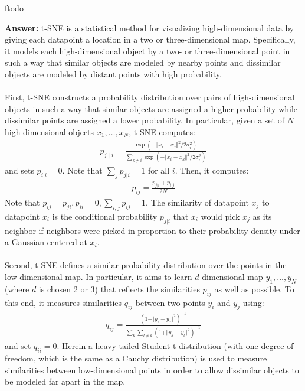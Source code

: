 ƒtodo\documentclass{article}
\newenvironment{QandA}{\begin{enumerate}[label=\arabic*.]}{\end{enumerate}}
\newenvironment{answer}{\par\normalfont \textbf{Answer:}}{}
\begin{document}
\begin{QandA}
    \begin{answer}
        t-SNE is a statistical method for visualizing high-dimensional data by giving each datapoint a location in a two or three-dimensional map. Specifically, it models each high-dimensional object by a two- or three-dimensional point in such a way that similar objects are modeled by nearby points and dissimilar objects are modeled by distant points with high probability. \\\\
        First, t-SNE constructs a probability distribution over pairs of high-dimensional objects in such a way that similar objects are assigned a higher probability while dissimilar points are assigned a lower probability. In particular, given a set of $N$ high-dimensional objects $x_1, \ldots, x_N$, t-SNE computes:
        \begin{align*}
            p_{j \mid i} = \frac{\exp(- \Vert x_i - x_j\Vert^2/2\sigma_i^2)}{\sum_{k \neq i} \exp(- \Vert x_i - x_k\Vert^2/2\sigma_i^2)}
        \end{align*}
        and sets $p_{i \vert i} = 0$. Note that $\sum_j p_{j \vert i} = 1$ for all $i$. Then, it computes:
        \begin{align*}
            p_{ij} = \frac{p_{j \vert i} + p_{i \vert j}}{2N}
        \end{align*}
    Note that $p_{ij} = p_{ji}, p_{ii} = 0, \sum_{i,j} p_{ij} = 1$. The similarity of datapoint $x_j$ to datapoint $x_i$ is the conditional probability $p_{j \vert i}$ that $x_i$ would pick $x_j$ as its neighbor if neighbors were picked in proportion to their probability density under a Gaussian centered at $x_i$. \\\\
    Second, t-SNE defines a similar probability distribution over the points in the low-dimensional map. In particular, it aims to learn $d$-dimensional map $y_1, \ldots, y_N$ (where $d$ is chosen 2 or 3) that reflects the similarities $p_{ij}$ as well as possible. To this end, it measures similarities $q_{ij}$ between two points $y_i$ and $y_j$ using:
    \begin{align*}
        q_{ij} = \frac{(1 + \Vert y_i - y_j \Vert^2)^{-1}}{\sum_k \sum_{l \neq k} (1 + \Vert y_k - y_l \Vert^2)^{-1}}
    \end{align*}
    and set $q_{ii} = 0$. Herein a heavy-tailed Student t-distribution (with one-degree of freedom, which is the same as a Cauchy distribution) is used to measure similarities between low-dimensional points in order to allow dissimilar objects to be modeled far apart in the map. \\\\

\end{answer}
\end{QandA}
\end{document}

